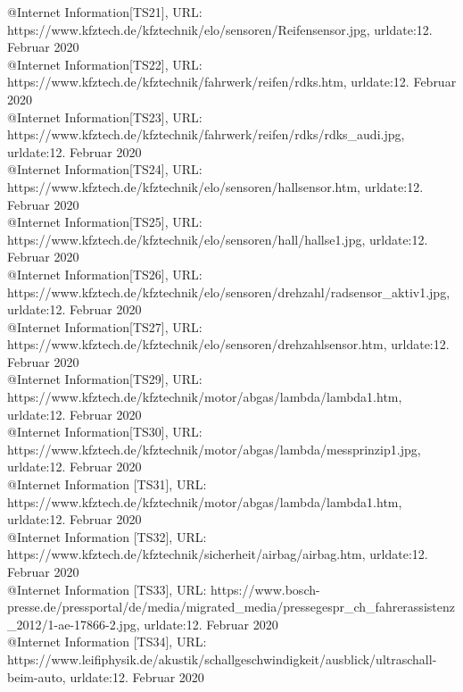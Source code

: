 @Internet{ Information[TS21],
	URL: https://www.kfztech.de/kfztechnik/elo/sensoren/Reifensensor.jpg,
	urldate:12. Februar 2020}
\\

@Internet{ Information[TS22],
	URL: https://www.kfztech.de/kfztechnik/fahrwerk/reifen/rdks.htm,
	urldate:12. Februar 2020}
\\

@Internet{ Information[TS23],
	URL: https://www.kfztech.de/kfztechnik/fahrwerk/reifen/rdks/rdks_audi.jpg,
	urldate:12. Februar 2020}
\\

@Internet{ Information[TS24],
	URL: https://www.kfztech.de/kfztechnik/elo/sensoren/hallsensor.htm,
	urldate:12. Februar 2020}
\\

@Internet{ Information[TS25],
	URL: https://www.kfztech.de/kfztechnik/elo/sensoren/hall/hallse1.jpg,
	urldate:12. Februar 2020}
\\

@Internet{ Information[TS26],
	URL: https://www.kfztech.de/kfztechnik/elo/sensoren/drehzahl/radsensor_aktiv1.jpg,
	urldate:12. Februar 2020}
\\

@Internet{ Information[TS27],
	URL: https://www.kfztech.de/kfztechnik/elo/sensoren/drehzahlsensor.htm,
	urldate:12. Februar 2020}
\\

@Internet{ Information[TS29],
	URL: https://www.kfztech.de/kfztechnik/motor/abgas/lambda/lambda1.htm,
	urldate:12. Februar 2020}
\\

@Internet{ Information[TS30],
	URL: https://www.kfztech.de/kfztechnik/motor/abgas/lambda/messprinzip1.jpg,
	urldate:12. Februar 2020}
\\

@Internet{ Information [TS31],
	URL: https://www.kfztech.de/kfztechnik/motor/abgas/lambda/lambda1.htm,
	urldate:12. Februar 2020}
\\

@Internet{ Information [TS32],
	URL: https://www.kfztech.de/kfztechnik/sicherheit/airbag/airbag.htm,
	urldate:12. Februar 2020}
\\

@Internet{ Information [TS33],
	URL: https://www.bosch-presse.de/pressportal/de/media/migrated_media/pressegespr_ch_fahrerassistenz_2012/1-ae-17866-2.jpg,
	urldate:12. Februar 2020}
\\

@Internet{ Information [TS34],
	URL: https://www.leifiphysik.de/akustik/schallgeschwindigkeit/ausblick/ultraschall-beim-auto,
	urldate:12. Februar 2020}